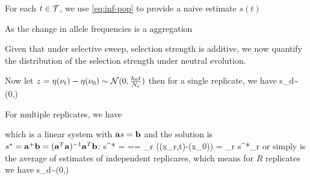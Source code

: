 \documentclass[11pt]{article}
\begin{document}
For each $t\in {\cal T}$, we
use \eqref{eq:inf-pop} to provide a naive estimate $s(t)$ 



As the change in allele frequencies is a aggregation 

Given that under selective sweep, selection strength is additive, we now 
quantify the distribution of the selection strength under neutral evolution.

Now let $z=\eta(\nu_t)- \eta(\nu_0)\sim {\cal N}(0,\frac{h_0 t}{N_e})$ then for a 
single replicate, we have
\beq
s_d\sim \Nc\left(0,\right)
\eeq

For multiple replicates, we have

which is a linear system with ${\mathbf a} s ={\mathbf b}$ and the solution is 
$s^*={\mathbf a}^+{\mathbf b}=({\mathbf a}^T{\mathbf a})^{-1}{\mathbf a}^T{\mathbf b}$:
\beq
s^* = ==
\sum_r   (\eta(x_{r,t})-\eta(x_0)) =   \sum_r 
s^*_r
\eeq
or simply is the average of estimates of independent replicares, which means 
for $R$ replicates we have
\beq
s_d\sim \Nc\left(0,\right)
\eeq
\end{document}
